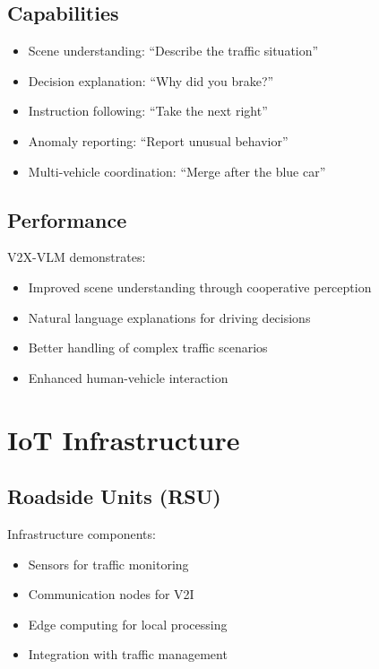 \documentclass[12pt,a4paper]{article}
\begin{document}
\subsection{Capabilities}

\begin{tcolorbox}[colback=vehiclegreen!10, colframe=vehiclegreen, title=V2X-VLM Capabilities]
\begin{itemize}
    \item Scene understanding: ``Describe the traffic situation''
    \item Decision explanation: ``Why did you brake?''
    \item Instruction following: ``Take the next right''
    \item Anomaly reporting: ``Report unusual behavior''
    \item Multi-vehicle coordination: ``Merge after the blue car''
\end{itemize}
\end{tcolorbox}

\subsection{Performance}

V2X-VLM demonstrates:
\begin{itemize}
    \item Improved scene understanding through cooperative perception
    \item Natural language explanations for driving decisions
    \item Better handling of complex traffic scenarios
    \item Enhanced human-vehicle interaction
\end{itemize}

\section{IoT Infrastructure}

\subsection{Roadside Units (RSU)}

Infrastructure components:
\begin{itemize}
    \item Sensors for traffic monitoring
    \item Communication nodes for V2I
    \item Edge computing for local processing
    \item Integration with traffic management
\end{itemize}
\end{document}
